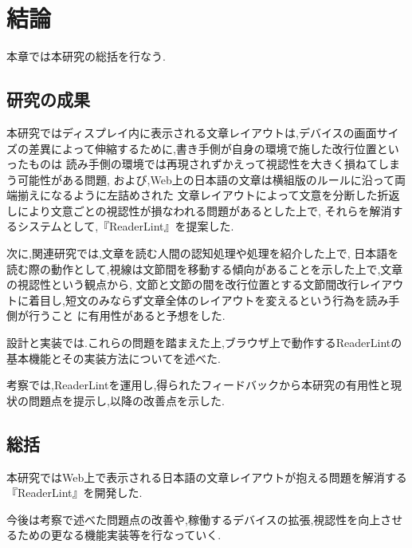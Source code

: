 \chapter{結論}

本章では本研究の総括を行なう.

\newpage

\section{研究の成果}
本研究ではディスプレイ内に表示される文章レイアウトは,デバイスの画面サイズの差異によって伸縮するために,書き手側が自身の環境で施した改行位置といったものは
読み手側の環境では再現されずかえって視認性を大きく損ねてしまう可能性がある問題,
および,Web上の日本語の文章は横組版のルールに沿って両端揃えになるように左詰めされた
文章レイアウトによって文意を分断した折返しにより文意ごとの視認性が損なわれる問題があるとした上で,
それらを解消するシステムとして,『ReaderLint』を提案した.

次に,関連研究では,文章を読む人間の認知処理や処理を紹介した上で,
日本語を読む際の動作として,視線は文節間を移動する傾向があることを示した上で,文章の視認性という観点から,
文節と文節の間を改行位置とする文節間改行レイアウトに着目し,短文のみならず文章全体のレイアウトを変えるという行為を読み手側が行うこと
に有用性があると予想をした.

設計と実装では.これらの問題を踏まえた上,ブラウザ上で動作するReaderLintの基本機能とその実装方法についてを述べた.

考察では,ReaderLintを運用し,得られたフィードバックから本研究の有用性と現状の問題点を提示し,以降の改善点を示した.

\section{総括}
本研究ではWeb上で表示される日本語の文章レイアウトが抱える問題を解消する『ReaderLint』を開発した.

今後は考察で述べた問題点の改善や,稼働するデバイスの拡張,視認性を向上させるための更なる機能実装等を行なっていく.
